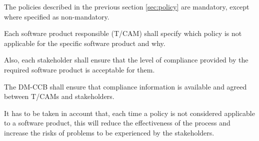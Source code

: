 The policies described in the previous section \ref{sec:policy} are mandatory, except where specified as non-mandatory.

Each software product responsible (T/CAM) shall specify which policy is not applicable for the specific software product and why.

Also, each stakeholder shall ensure that the level of compliance provided by the required software product is acceptable for them.

The DM-CCB shall ensure that compliance information is available and agreed between T/CAMs and stakeholders.

It has to be taken in account that, each time a policy is not considered applicable to a software product, this will reduce the effectiveness of the process and increase the risks of problems to be experienced by the stakeholders.
